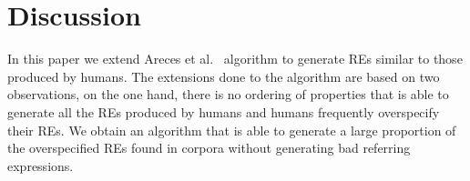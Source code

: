 \section{Discussion}
\label{sec:discussion}

In this paper we extend Areces et al.~ algorithm to generate REs similar to those produced by humans. The extensions done to the algorithm are based on two observations, on the one hand, there is no ordering of properties that is able to generate all the REs produced by humans and humans frequently overspecify their REs. We obtain an algorithm that is able to generate a large proportion of the overspecified REs found in corpora without generating bad referring expressions. 

